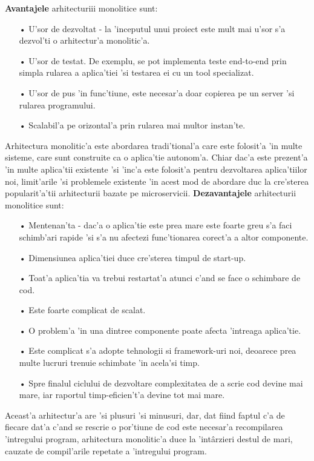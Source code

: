 \documentclass[12pt,a4paper,twoside]{report}
\begin{document}
\textbf{Avantajele} arhitecturiii monolitice sunt: 
\begin{itemize}
\item[•]U'sor de dezvoltat - la 'inceputul unui proiect este mult mai u'sor s'a dezvol'ti o arhitectur'a monolitic'a.
\item[•]U'sor de testat. De exemplu, se pot implementa teste end-to-end prin simpla rularea a aplica'tiei 'si testarea ei cu un tool specializat.
\item[•]U'sor de pus 'in func'tiune, este necesar'a doar copierea pe un server 'si rularea programului.
\item[•]Scalabil'a pe orizontal'a prin rularea mai multor instan'te.
\end{itemize}
Arhitectura monolitic'a este abordarea tradi'tional'a care este folosit'a 'in multe sisteme, care sunt construite ca o aplica'tie autonom'a. Chiar dac'a este prezent'a 'in multe aplica'tii existente 'si 'inc'a este folosit'a pentru dezvoltarea aplica'tiilor noi, limit'arile 'si problemele existente 'in acest mod de abordare duc la cre'sterea popularit'a'tii arhitecturii bazate pe microservicii. \textbf{Dezavantajele} arhitecturii monolitice sunt:
\begin{itemize}
\item[•] Mentenan'ta - dac'a o aplica'tie este prea mare este foarte greu s'a faci schimb'ari rapide 'si s'a nu afectezi func'tionarea corect'a a altor componente.
\item[•]Dimensiunea aplica'tiei duce cre'sterea timpul de start-up.
\item[•]Toat'a aplica'tia va trebui restartat'a atunci c'and se face o schimbare de cod.
\item[•]Este foarte complicat de scalat.
\item[•]O problem'a 'in una dintree componente poate afecta 'intreaga aplica'tie.
\item[•]Este complicat s'a adopte tehnologii si framework-uri noi, deoarece prea multe lucruri trenuie schimbate 'in acela'si timp.
\item[•]Spre finalul ciclului de dezvoltare complexitatea de a scrie cod devine mai mare, iar raportul timp-eficien't'a devine tot mai mare.
\end{itemize}

Aceast'a arhitectur'a are 'si plusuri 'si minusuri, dar, dat fiind faptul c'a de fiecare dat'a c'and se rescrie o por'tiune de cod este necesar'a recompilarea 'intregului program, arhitectura monolitic'a  duce la 'intârzieri destul de mari, cauzate de compil'arile repetate a 'intregului program.
\end{document}
